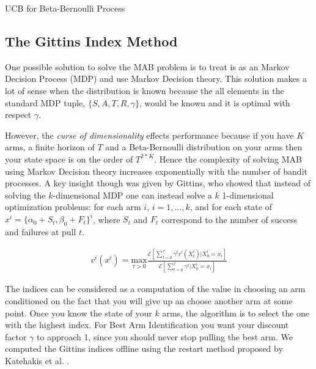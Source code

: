 \documentclass[letterpaper, 10 pt, conference]{ieeeconf}  %
\begin{document}
\begin{algorithm}
 \caption{UCB for Beta-Bernoulli Process}
\end{algorithm}

\subsection{The Gittins Index Method} 
One possible solution to solve the MAB problem is to treat is as an Markov Decision Process (MDP) and use Markov Decision theory. This solution makes a lot of sense when the distribution is known because the all elements in the standard MDP tuple, $\lbrace S,A,T,R,\gamma \rbrace$, would be known and it is optimal with respect $\gamma$. 

However, the \textit{curse of dimensionality} effects performance because if you have $K$ arms, a finite horizon of $T$ and a Beta-Bernoulli distribution on your arms then your state space is on the order of $T^{2*K}$. Hence the complexity of solving MAB using Markov Decision theory increases exponentially with the number of bandit processes. A key insight though was given by Gittins, who showed that instead of solving the $k$-dimensional MDP one can instead solve a $k$ 1-dimensional optimization problems: for each arm $i$, $i= 1,...,k$, and for each state of $x^i = \lbrace \alpha_0 +S_t, \beta_0 +F_t \rbrace^i$, where $S_t$ and $F_t$ correspond to the number of success and failures at pull $t$. 


\vspace{-2ex}
\label{eq:git_indices}
\begin{align}
	v^i(x^i) = \underset{\tau>0}{\mbox{max}} \frac{\mathcal{E}[\sum_{t=0}^{\tau}\gamma^tr^i(X_t^i)|X_0^i = x_i]}{\mathcal{E}[\sum_{t=0}^{\tau}\gamma^t|X_0^i = x_i]}
\end{align}


The indices can be considered as a computation of the value in choosing an arm conditioned on the fact that you will give up an choose another arm at some point. Once you know the state of your $k$ arms, the algorithm is to select the one with the highest index.  For Best Arm Identification you want your discount factor $\gamma$ to approach 1, since you should never stop pulling the best arm. We computed the Gittins indices offline using the restart method proposed by Katehakis et al. \cite{katehakis1987multi}.
\end{document}
